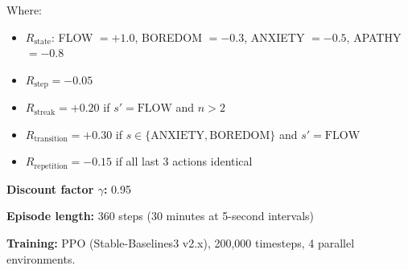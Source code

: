 Where:
\begin{itemize}
\item $R_{\text{state}}$: FLOW $= +1.0$, BOREDOM $= -0.3$, ANXIETY $= -0.5$, APATHY $= -0.8$
\item $R_{\text{step}} = -0.05$
\item $R_{\text{streak}} = +0.20$ if $s' = \text{FLOW}$ and $n > 2$
\item $R_{\text{transition}} = +0.30$ if $s \in \{\text{ANXIETY}, \text{BOREDOM}\}$ and $s' = \text{FLOW}$
\item $R_{\text{repetition}} = -0.15$ if all last 3 actions identical
\end{itemize}

\textbf{Discount factor $\gamma$:} 0.95

\textbf{Episode length:} 360 steps (30 minutes at 5-second intervals)

\textbf{Training:} PPO (Stable-Baselines3 v2.x), 200,000 timesteps, 4 parallel environments.

